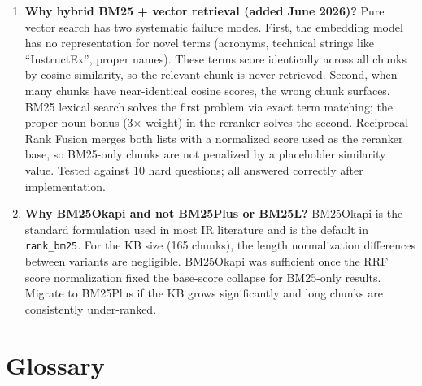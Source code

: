 \documentclass[12pt,letterpaper]{article}
\begin{document}
\begin{enumerate}[leftmargin=2em]
  \item \textbf{Why hybrid BM25 + vector retrieval (added June 2026)?}
        Pure vector search has two systematic failure modes. First, the
        embedding model has no representation for novel terms (acronyms,
        technical strings like ``InstructEx'', proper names). These terms
        score identically across all chunks by cosine similarity, so the
        relevant chunk is never retrieved. Second, when many chunks have
        near-identical cosine scores, the wrong chunk surfaces. BM25 lexical
        search solves the first problem via exact term matching; the proper
        noun bonus (3$\times$ weight) in the reranker solves the second.
        Reciprocal Rank Fusion merges both lists with a normalized score
        used as the reranker base, so BM25-only chunks are not penalized
        by a placeholder similarity value. Tested against 10 hard questions;
        all answered correctly after implementation.

  \item \textbf{Why BM25Okapi and not BM25Plus or BM25L?} BM25Okapi is the
        standard formulation used in most IR literature and is the default
        in \texttt{rank\_bm25}. For the KB size (165 chunks), the length
        normalization differences between variants are negligible. BM25Okapi
        was sufficient once the RRF score normalization fixed the base-score
        collapse for BM25-only results. Migrate to BM25Plus if the KB grows
        significantly and long chunks are consistently under-ranked.
\end{enumerate}

\section{Glossary}
\end{document}
